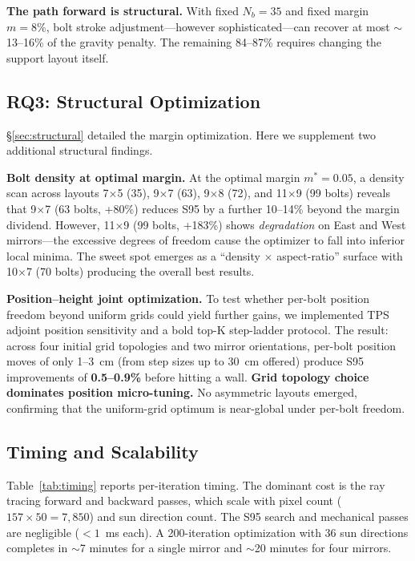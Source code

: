 \documentclass{CVM}
\begin{document}
\textbf{The path forward is structural.} With fixed $N_b = 35$ and fixed
margin $m = 8\%$, bolt stroke adjustment---however sophisticated---can recover
at most $\sim$13--16\% of the gravity penalty. The remaining 84--87\% requires
changing the support layout itself.

\subsection{RQ3: Structural Optimization}

\S\ref{sec:structural} detailed the margin optimization. Here we supplement
two additional structural findings.

\textbf{Bolt density at optimal margin.} At the optimal margin $m^*{=}0.05$,
a density scan across layouts 7$\times$5 (35), 9$\times$7 (63), 9$\times$8 (72),
and 11$\times$9 (99 bolts) reveals that 9$\times$7 (63 bolts, +80\%) reduces
S95 by a further 10--14\% beyond the margin dividend. However, 11$\times$9 (99
bolts, +183\%) shows \emph{degradation} on East and West mirrors---the
excessive degrees of freedom cause the optimizer to fall into inferior local
minima. The sweet spot emerges as a ``density $\times$ aspect-ratio'' surface
with 10$\times$7 (70 bolts) producing the overall best results.

\textbf{Position--height joint optimization.} To test whether per-bolt position
freedom beyond uniform grids could yield further gains, we implemented TPS
adjoint position sensitivity and a bold top-K step-ladder protocol. The result:
across four initial grid topologies and two mirror orientations, per-bolt
position moves of only 1--3~cm (from step sizes up to 30~cm offered) produce
S95 improvements of \textbf{0.5--0.9\%} before hitting a wall. \textbf{Grid
topology choice dominates position micro-tuning.} No asymmetric layouts
emerged, confirming that the uniform-grid optimum is near-global under per-bolt
freedom.

\subsection{Timing and Scalability}

Table~\ref{tab:timing} reports per-iteration timing. The dominant cost is the
ray tracing forward and backward passes, which scale with pixel count
($157\times50 = 7{,}850$) and sun direction count. The S95 search and
mechanical passes are negligible ($<1$~ms each). A 200-iteration optimization
with 36 sun directions completes in $\sim$7 minutes for a single mirror and
$\sim$20 minutes for four mirrors.
\end{document}
